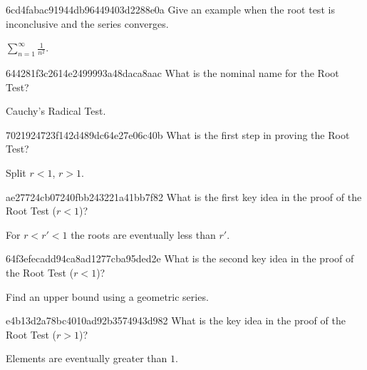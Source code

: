 \begin{note}{6cd4fabac91944db96449403d2288e0a}
    Give an example when the root test is inconclusive and the series converges.

    \begin{cloze}{1}
        \({ \sum_{n=1}^{\infty} \frac{1}{n^2} }\).
    \end{cloze}
\end{note}

\begin{note}{644281f3c2614e2499993a48daca8aac}
    What is the nominal name for the Root Test?

    \begin{cloze}{1}
        Cauchy's Radical Test.
    \end{cloze}
\end{note}

\begin{note}{7021924723f142d489dc64e27e06c40b}
    What is the first step in proving the Root Test?

    \begin{cloze}{1}
        Split \({ r < 1 }\), \({ r > 1 }\).
    \end{cloze}
\end{note}

\begin{note}{ae27724cb07240fbb243221a41bb7f82}
    What is the first key idea in the proof of the Root Test (\({ r < 1 }\))?

    \begin{cloze}{1}
        For \({ r < r' < 1 }\) the roots are eventually less than \({ r' }\).
    \end{cloze}
\end{note}

\begin{note}{64f3efecadd94ca8ad1277cba95ded2e}
    What is the second key idea in the proof of the Root Test (\({ r < 1 }\))?

    \begin{cloze}{1}
        Find an upper bound using a geometric series.
    \end{cloze}
\end{note}

\begin{note}{e4b13d2a78bc4010ad92b3574943d982}
    What is the key idea in the proof of the Root Test (\({ r > 1 }\))?

    \begin{cloze}{1}
        Elements are eventually greater than \({ 1 }\).
    \end{cloze}
\end{note}


